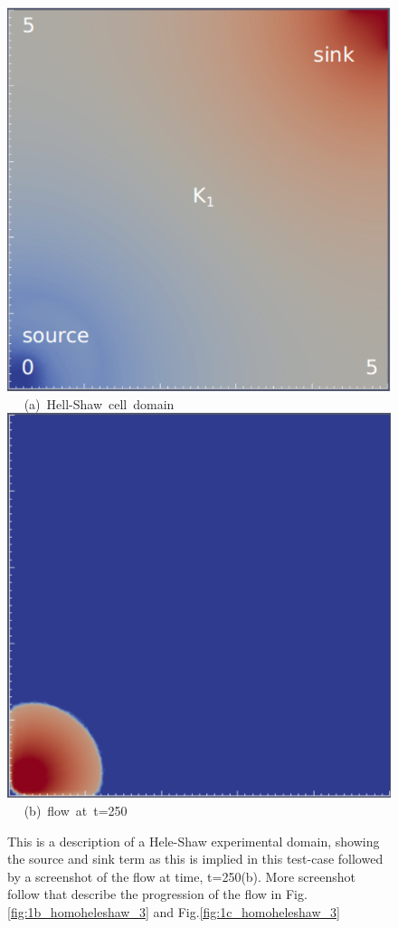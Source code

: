 \begin{figure}[ht] 
\vbox{
\hbox{\hspace{3.5cm}
\includegraphics[width=.5\textwidth]{./Pics1/Saffman_homogeneous_MR3/saffman_homo_fixed_1.pdf} 
}
\vspace{0.0cm}
\hbox{\hspace{5.0cm} (a) Hell-Shaw cell domain   
}
\vspace{0.25cm}
\hbox{\hspace{3.5cm}
\includegraphics[width=.5\textwidth]{./Pics1/Saffman_homogeneous_MR3/saffman_homo_fixed_250.pdf}
}
\vspace{0.0cm}
\hbox{\hspace{5.0cm} (b) flow at t=250  
}
}     
\caption{This is a description of a Hele-Shaw experimental domain, showing the source and sink term as this is implied in this test-case followed by a screenshot of the flow at time, t=250(b). More screenshot follow that describe the progression of the flow in Fig.\ref{fig:1b_homoheleshaw_3} and Fig.\ref{fig:1c_homoheleshaw_3}}
\label{fig:1a_homoheleshaw_3}
\end{figure}



